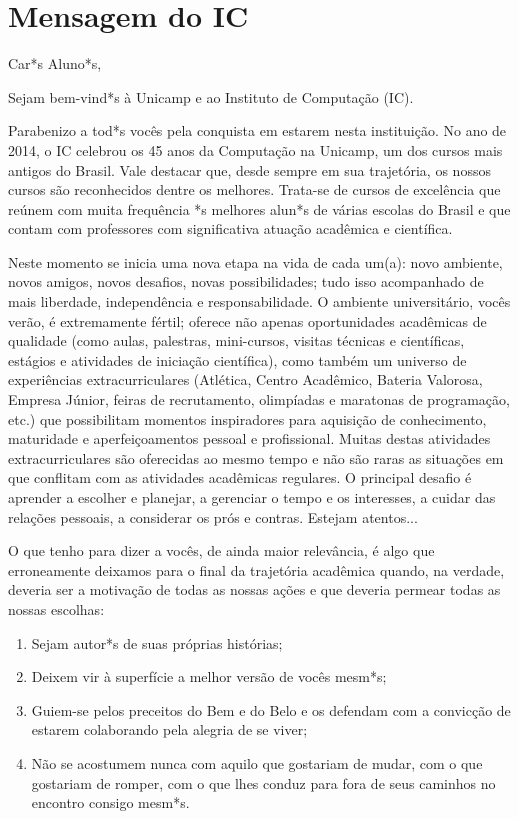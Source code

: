 
\section{Mensagem do IC}

Car*s Aluno*s,

Sejam bem-vind*s à Unicamp e ao Instituto de Computação (IC). 

Parabenizo a tod*s vocês pela conquista em estarem nesta instituição. No ano de
2014, o IC celebrou os 45 anos da Computação na Unicamp, um dos cursos mais
antigos do Brasil. Vale destacar que, desde sempre em sua trajetória, os nossos
cursos são reconhecidos dentre os melhores.  Trata-se de cursos de excelência
que reúnem com muita frequência *s melhores alun*s de várias escolas do Brasil e
que contam com professores com significativa atuação acadêmica e científica.

Neste momento se inicia uma nova etapa na vida de cada um(a): novo ambiente, novos
amigos, novos desafios, novas possibilidades; tudo isso acompanhado de mais
liberdade, independência e responsabilidade.  O ambiente universitário, vocês
verão, é extremamente fértil; oferece não apenas oportunidades acadêmicas de
qualidade (como aulas, palestras, mini-cursos, visitas técnicas e científicas,
estágios e atividades de iniciação científica), como também um universo de
experiências extracurriculares (Atlética, Centro Acadêmico, Bateria Valorosa,
Empresa Júnior, feiras de recrutamento, olimpíadas e maratonas de programação,
etc.) que possibilitam momentos inspiradores para aquisição de conhecimento,
maturidade e aperfeiçoamentos pessoal e profissional. Muitas destas atividades
extracurriculares são oferecidas ao mesmo tempo e não são raras as situações em
que conflitam com as atividades acadêmicas regulares. O principal desafio é
aprender a escolher e planejar, a gerenciar o tempo e os interesses, a cuidar
das relações pessoais, a considerar os prós e contras. Estejam atentos...

O que tenho para dizer a vocês, de ainda maior relevância, é algo que
erroneamente deixamos para o final da trajetória acadêmica quando, na verdade,
deveria ser a motivação de todas as nossas ações e que deveria permear todas as
nossas escolhas:

\begin{enumerate}
\item Sejam autor*s de suas próprias histórias;

\item Deixem vir à superfície a melhor versão de vocês mesm*s;

\item Guiem-se pelos preceitos do Bem e do Belo e os defendam com a convicção de
  estarem colaborando pela alegria de se viver;

\item Não se acostumem nunca com aquilo que gostariam de mudar, com o que
  gostariam de romper, com o que lhes conduz para fora de seus caminhos no
  encontro consigo mesm*s.
\end{enumerate}


